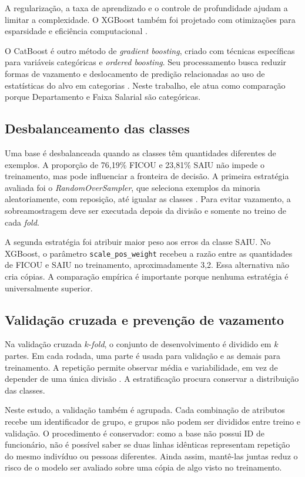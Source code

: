 \documentclass[12pt]{article}
\begin{document}
A regularização, a taxa de aprendizado e o controle de profundidade ajudam a limitar a complexidade. O XGBoost também foi projetado com otimizações para esparsidade e eficiência computacional \cite{chen2016xgboost}.

O CatBoost é outro método de \textit{gradient boosting}, criado com técnicas específicas para variáveis categóricas e \textit{ordered boosting}. Seu processamento busca reduzir formas de vazamento e deslocamento de predição relacionadas ao uso de estatísticas do alvo em categorias \cite{prokhorenkova2018catboost}. Neste trabalho, ele atua como comparação porque Departamento e Faixa Salarial são categóricas.

\subsection{Desbalanceamento das classes}

Uma base é desbalanceada quando as classes têm quantidades diferentes de exemplos. A proporção de 76,19\% FICOU e 23,81\% SAIU não impede o treinamento, mas pode influenciar a fronteira de decisão. A primeira estratégia avaliada foi o \textit{RandomOverSampler}, que seleciona exemplos da minoria aleatoriamente, com reposição, até igualar as classes \cite{lemaitre2017imbalanced}. Para evitar vazamento, a sobreamostragem deve ser executada depois da divisão e somente no treino de cada \textit{fold}.

A segunda estratégia foi atribuir maior peso aos erros da classe SAIU. No XGBoost, o parâmetro \texttt{scale\_pos\_weight} recebeu a razão entre as quantidades de FICOU e SAIU no treinamento, aproximadamente 3,2. Essa alternativa não cria cópias. A comparação empírica é importante porque nenhuma estratégia é universalmente superior.

\subsection{Validação cruzada e prevenção de vazamento}

Na validação cruzada $k$-\textit{fold}, o conjunto de desenvolvimento é dividido em $k$ partes. Em cada rodada, uma parte é usada para validação e as demais para treinamento. A repetição permite observar média e variabilidade, em vez de depender de uma única divisão \cite{kohavi1995crossvalidation}. A estratificação procura conservar a distribuição das classes.

Neste estudo, a validação também é agrupada. Cada combinação de atributos recebe um identificador de grupo, e grupos não podem ser divididos entre treino e validação. O procedimento é conservador: como a base não possui ID de funcionário, não é possível saber se duas linhas idênticas representam repetição do mesmo indivíduo ou pessoas diferentes. Ainda assim, mantê-las juntas reduz o risco de o modelo ser avaliado sobre uma cópia de algo visto no treinamento.
\end{document}
